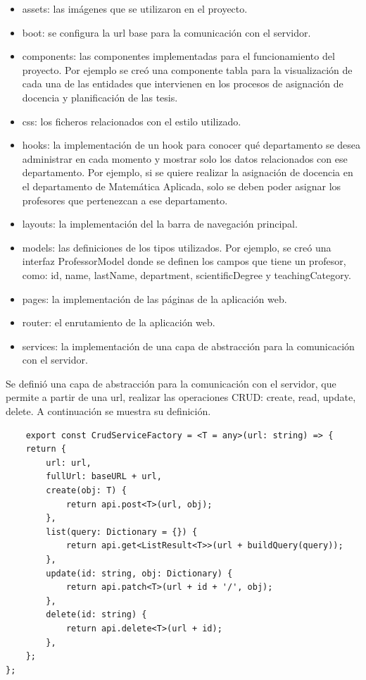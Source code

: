 \begin{itemize}
    \item assets: las imágenes que se utilizaron en el proyecto.
    \item boot: se configura la url base para la comunicación con el servidor. 
    \item components: las componentes implementadas para el funcionamiento del proyecto. 
    Por ejemplo se creó una componente tabla para la visualización de cada una de las entidades 
    que intervienen en los procesos de asignación de docencia y planificación de las tesis. 
    \item css: los ficheros relacionados con el estilo utilizado.
    \item hooks: la implementación de un hook para conocer qué departamento se desea administrar en cada momento 
    y mostrar solo los datos relacionados con ese departamento. Por ejemplo, si se quiere realizar la asignación de docencia en el 
    departamento de Matemática Aplicada, solo se deben poder asignar los profesores que pertenezcan a ese departamento.
    \item layouts: la implementación del la barra de navegación principal.
    \item models: las definiciones de los tipos utilizados. Por ejemplo, se creó una interfaz ProfessorModel donde se definen los 
    campos que tiene un profesor, como: id, name, lastName, department, scientificDegree y teachingCategory.  
    \item pages: la implementación de las páginas de la aplicación web.
    \item router: el enrutamiento de la aplicación web.
    \item services: la implementación de una capa de abstracción para la comunicación con el servidor.
\end{itemize}


Se definió una capa de abstracción para la comunicación con 
el servidor, que permite a partir de una url, realizar las operaciones CRUD: create, read, update, delete. 
A continuación se muestra su definición.

\begin{verbatim}
    export const CrudServiceFactory = <T = any>(url: string) => {
    return {
        url: url,
        fullUrl: baseURL + url,
        create(obj: T) {
            return api.post<T>(url, obj);
        },
        list(query: Dictionary = {}) {
            return api.get<ListResult<T>>(url + buildQuery(query));
        },
        update(id: string, obj: Dictionary) {
            return api.patch<T>(url + id + '/', obj);
        },
        delete(id: string) {
            return api.delete<T>(url + id);
        },
    };
};
\end{verbatim}


